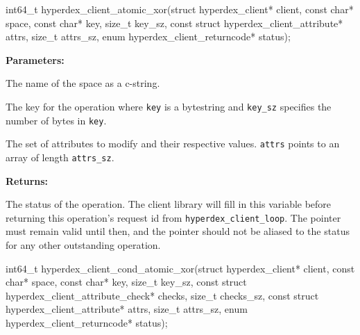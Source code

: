 \funcsep
\begin{ccode}
int64_t hyperdex_client_atomic_xor(struct hyperdex_client* client,
                const char* space,
                const char* key, size_t key_sz,
                const struct hyperdex_client_attribute* attrs, size_t attrs_sz,
                enum hyperdex_client_returncode* status);
\end{ccode}
\funcdesc 

\noindent\textbf{Parameters:}
\begin{description}[labelindent=\widthof{{\texttt{attrs}, \texttt{attrs\_sz}}},leftmargin=*,noitemsep,nolistsep,align=right]
\item[\texttt{space}] The name of the space as a c-string.
\item[\texttt{key}, \texttt{key\_sz}] The key for the operation where \texttt{key} is a bytestring and \texttt{key\_sz} specifies the number of bytes in \texttt{key}.
\item[\texttt{attrs}, \texttt{attrs\_sz}] The set of attributes to modify and their respective values.  \texttt{attrs} points to an array of length \texttt{attrs\_sz}.
\end{description}

\noindent\textbf{Returns:}
\begin{description}[labelindent=\widthof{{\texttt{status}}},leftmargin=*,noitemsep,nolistsep,align=right]
\item[\texttt{status}] The status of the operation.  The client library will fill in this variable before returning this operation's request id from \texttt{hyperdex\_client\_loop}.  The pointer must remain valid until then, and the pointer should not be aliased to the status for any other outstanding operation.
\end{description}

\funcsep
\begin{ccode}
int64_t hyperdex_client_cond_atomic_xor(struct hyperdex_client* client,
                const char* space,
                const char* key, size_t key_sz,
                const struct hyperdex_client_attribute_check* checks, size_t checks_sz,
                const struct hyperdex_client_attribute* attrs, size_t attrs_sz,
                enum hyperdex_client_returncode* status);
\end{ccode}
\funcdesc 

